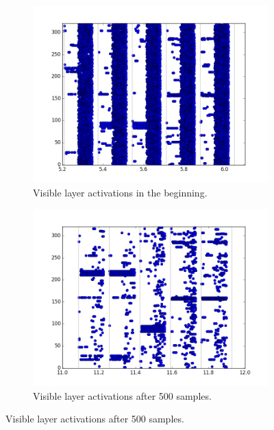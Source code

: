 \begin{figure}[h!]
	\centering
	\begin{subfigure}[t]{.32\textwidth}
  		\centering
  		\includegraphics[width=.9\linewidth]{imgs/7x7/20076_v.png}
  		\caption{Visible layer activations in the beginning.}
  		\label{fig:sub1}
	\end{subfigure}%
	\begin{subfigure}[t]{.32\textwidth}
  		\centering
  		\includegraphics[width=.9\linewidth]{imgs/7x7/20946_v.png}
  		\caption{Visible layer  activations after 500 samples.}
  		\label{fig:sub2}
	\end{subfigure}
	

\end{figure}
